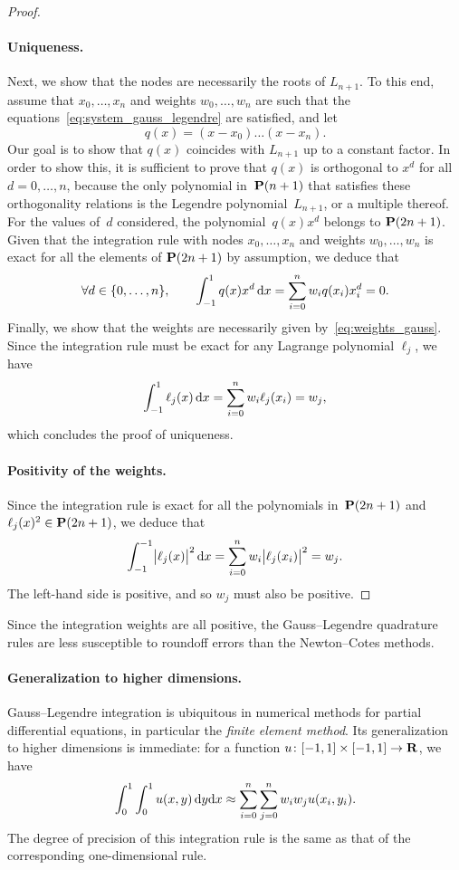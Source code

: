 \begin{proof}
    \paragraph{Uniqueness.}
    Next,
    we show that the nodes are necessarily the roots of $L_{n+1}$.
    To this end,
    assume that $x_0, \dotsc, x_n$ and weights $w_0, \dotsc, w_n$ are such that the equations~\eqref{eq:system_gauss_legendre} are satisfied,
    and let
    \[
        q(x) = (x - x_0) \dotsc (x - x_n).
    \]
    Our goal is to show that $q(x)$ coincides with $L_{n+1}$ up to a constant factor.
    In order to show this,
    it is sufficient to prove that $q(x)$ is orthogonal to $x^d$ for all $d = 0, \dotsc, n$,
    because the only polynomial in~$\mathbf P(n+1)$ that satisfies these orthogonality relations is the Legendre polynomial~$L_{n+1}$,
    or a multiple thereof.
    For the values of~$d$ considered, the polynomial~$q(x) x^d$ belongs to $\mathbf P(2n+1)$.
    Given that the integration rule with nodes $x_0, \dotsc, x_n$ and weights $w_0,\dotsc, w_n$ is exact for all the elements of $\mathbf P(2n+1)$ by assumption,
    we deduce that
    \[
        \forall d \in \{0, \dotsc, n\},
        \qquad \int_{-1}^{1} q(x) x^d \, \mathrm d x = \sum_{i=0}^{n} w_i q(x_i) x_i^d = 0.
    \]
    Finally, we show that the weights are necessarily given by~\eqref{eq:weights_gauss}.
    Since the integration rule must be exact for any Lagrange polynomial $\ell_j$,
    we have
    \[
        \int_{-1}^{1} \ell_j(x) \, \mathrm d x = \sum_{i=0}^{n} w_i \ell_j(x_i) = w_j,
    \]
    which concludes the proof of uniqueness.
    \paragraph{Positivity of the weights.}
    Since the integration rule is exact for all the polynomials in~$\mathbf P(2n+1)$ and $\ell_j(x)^2 \in \mathbf P(2n+1)$,
    we deduce that
    \[
        \int_{-1}^{-1} \bigl\lvert \ell_j(x) \bigr\rvert^2 \, \mathrm d x
        = \sum_{i=0}^{n} w_i \bigl\lvert \ell_j(x_i) \bigr\rvert^2 = w_j.
    \]
    The left-hand side is positive,
    and so $w_j$ must also be positive.
\end{proof}

Since the integration weights are all positive,
the Gauss--Legendre quadrature rules are less susceptible to roundoff errors than the Newton--Cotes methods.

\paragraph{Generalization to higher dimensions.}
Gauss--Legendre integration is ubiquitous in numerical methods for partial differential equations,
in particular the \emph{finite element method}.
Its generalization to higher dimensions is immediate:
for a function $u\colon [-1, 1] \times [-1, 1] \to \mathbf R$,
we have
\[
    \int_{0}^{1} \int_{0}^{1} u(x, y) \, \mathrm d y \mathrm d x \approx \sum_{i=0}^{n} \sum_{j=0}^{n} w_i w_j u(x_i, y_i).
\]
The degree of precision of this integration rule is the same as
that of the corresponding one-dimensional rule.

